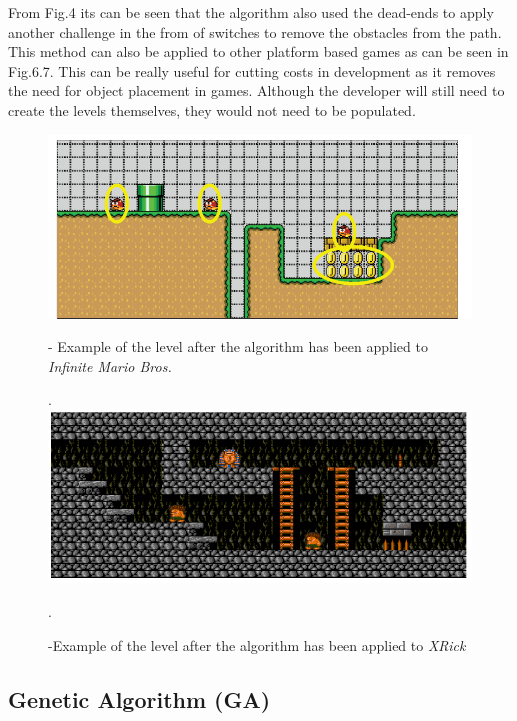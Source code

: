 \documentclass{scrartcl}
\begin{document}
From Fig.4 its can be seen that the algorithm also used the dead-ends to apply another challenge in the from of switches to remove the obstacles from the path. This method can also be applied to other platform based games as can be seen in Fig.6.7. This can be really useful for cutting costs in development as it removes the need for object placement in games. Although the developer will still need to create the levels themselves, they would not need to be populated\cite{fausto}.
\newline
\newline
\begin{figure}[h]
	\centering
	\includegraphics[width=0.7\linewidth]{Fig6}
	\caption{ - Example of the level after the algorithm has been applied to \textit{Infinite Mario Bros.}}.
	\label{Fig6}
	\centering
	\includegraphics[width=0.7\linewidth]{Fig7}
	\caption{ -Example of the level after the algorithm has been applied to \textit{XRick}}.
	\label{Fig7}
\end{figure}\cite{fausto}


\subsection{Genetic Algorithm (GA)}
\end{document}

